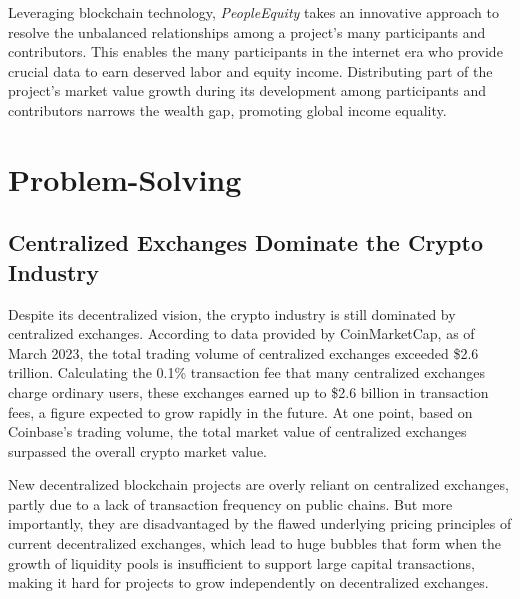 \documentclass{article}
\begin{document}



Leveraging blockchain technology, \emph{PeopleEquity} takes an innovative approach to resolve the unbalanced relationships among a project’s many participants and contributors. This enables the many participants in the internet era who provide crucial data to earn deserved labor and equity income. Distributing part of the project's market value growth during its development among participants and contributors narrows the wealth gap, promoting global income equality.

\section{Problem-Solving}

\subsection{Centralized Exchanges Dominate the Crypto Industry}

Despite its decentralized vision, the crypto industry is still dominated by centralized exchanges. According to data provided by CoinMarketCap, as of March 2023, the total trading volume of centralized exchanges exceeded \$2.6 trillion. Calculating the 0.1\% transaction fee that many centralized exchanges charge ordinary users, these exchanges earned up to \$2.6 billion in transaction fees, a figure expected to grow rapidly in the future. At one point, based on Coinbase's trading volume, the total market value of centralized exchanges surpassed the overall crypto market value.

New decentralized blockchain projects are overly reliant on centralized exchanges,  partly due to a lack of transaction frequency on public chains. But more importantly, they are disadvantaged by the flawed underlying pricing principles of current decentralized exchanges, which lead to huge bubbles that form when the growth of liquidity pools is insufficient to support large capital transactions, making it hard for projects to grow independently on decentralized exchanges. 
\end{document}
